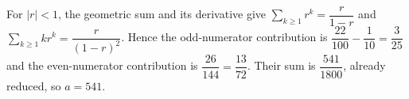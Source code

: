 For $|r|<1$, the geometric sum and its derivative give $\sum_{k\ge1}r^k=\dfrac{r}{1-r}$ and $\sum_{k\ge1}kr^k=\dfrac{r}{(1-r)^2}$. Hence the odd-numerator contribution is $\dfrac{22}{100}-\dfrac{1}{10}=\dfrac{3}{25}$ and the even-numerator contribution is $\dfrac{26}{144}=\dfrac{13}{72}$. Their sum is $\dfrac{541}{1800}$, already reduced, so $\boxed{a=541}$.
